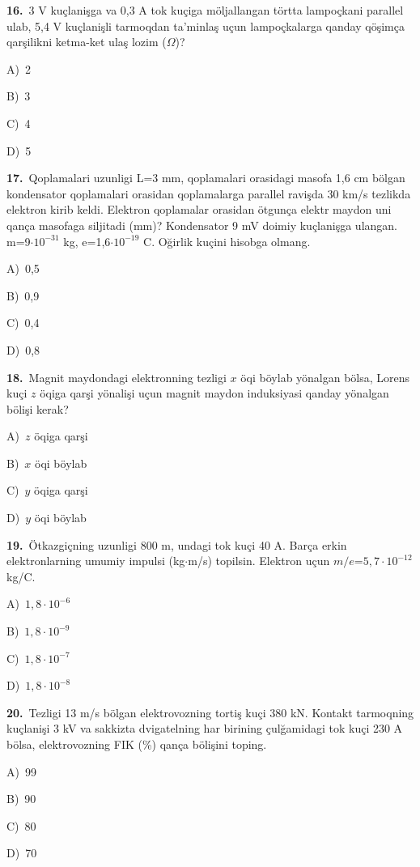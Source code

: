 \documentclass[11pt,a4paper]{article}
\newcommand{\opt}[2]{\hspace*{4mm}#1)\ #2\par}
\begin{document}
\noindent\begin{minipage}{\linewidth}
\textbf{16.}\ 3 V kuçlanişga va 0,3 A tok kuçiga möljallangan törtta lampoçkani parallel ulab, 5,4 V kuçlanişli tarmoqdan ta’minlaş uçun lampoçkalarga qanday qöşimça qarşilikni ketma-ket ulaş lozim ($\Omega$)?\par\smallskip
\opt{A}{2}
\opt{B}{3}
\opt{C}{4}
\opt{D}{5}
\end{minipage}\vspace{9pt}\par
\noindent\begin{minipage}{\linewidth}
\textbf{17.}\ Qoplamalari uzunligi L=3 mm, qoplamalari orasidagi masofa 1,6 cm bölgan kondensator qoplamalari orasidan qoplamalarga parallel ravişda 30 km/s tezlikda elektron kirib keldi. Elektron qoplamalar orasidan ötgunça elektr maydon uni qança masofaga siljitadi (mm)? Kondensator 9 mV doimiy kuçlanişga ulangan. m=9$\cdot10^{-31}$ kg, e=1,6$\cdot10^{-19}$ C. Oğirlik kuçini hisobga olmang.\par\smallskip
\opt{A}{0,5}
\opt{B}{0,9}
\opt{C}{0,4}
\opt{D}{0,8}
\end{minipage}\vspace{9pt}\par
\noindent\begin{minipage}{\linewidth}
\textbf{18.}\ Magnit maydondagi elektronning tezligi $x$ öqi böylab yönalgan bölsa, Lorens kuçi $z$ öqiga qarşi yönalişi uçun magnit maydon induksiyasi qanday yönalgan bölişi kerak?\par\smallskip
\opt{A}{$z$ öqiga qarşi}
\opt{B}{$x$ öqi böylab}
\opt{C}{$y$ öqiga qarşi}
\opt{D}{$y$ öqi böylab}
\end{minipage}\vspace{9pt}\par
\noindent\begin{minipage}{\linewidth}
\textbf{19.}\ Ötkazgiçning uzunligi 800 m, undagi tok kuçi 40 A. Barça erkin elektronlarning umumiy impulsi (kg$\cdot$m/s) topilsin. Elektron uçun $m/e$=$5{,}7\cdot10^{-12}$ kg/C.\par\smallskip
\opt{A}{$1{,}8\cdot10^{-6}$}
\opt{B}{$1{,}8\cdot10^{-9}$}
\opt{C}{$1{,}8\cdot10^{-7}$}
\opt{D}{$1{,}8\cdot10^{-8}$}
\end{minipage}\vspace{9pt}\par
\noindent\begin{minipage}{\linewidth}
\textbf{20.}\ Tezligi 13 m/s bölgan elektrovozning tortiş kuçi 380 kN. Kontakt tarmoqning kuçlanişi 3 kV va sakkizta dvigatelning har birining çulğamidagi tok kuçi 230 A bölsa, elektrovozning FIK (\%) qança bölişini toping.\par\smallskip
\opt{A}{99}
\opt{B}{90}
\opt{C}{80}
\opt{D}{70}
\end{minipage}\vspace{9pt}\par
\end{document}

